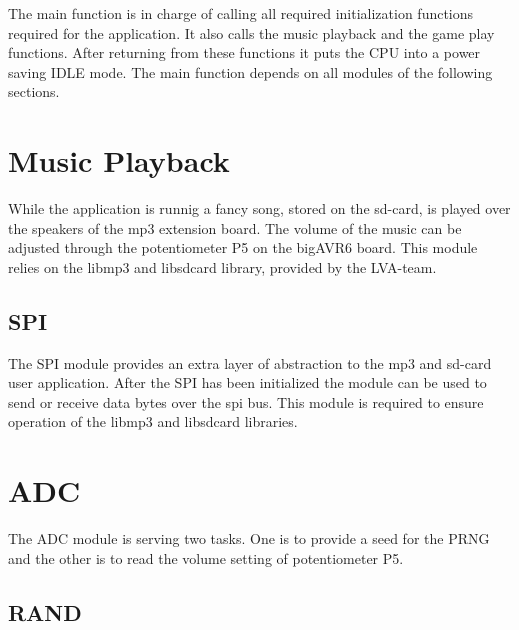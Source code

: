 \documentclass[12pt,a4paper,titlepage,oneside]{article}
\begin{document}
The main function is in charge of calling all required initialization functions
required for the application. It also calls the music playback and the game play
functions. After returning from these functions it puts the CPU into a power
saving IDLE mode.
\noindent
The main function depends on all modules of the following sections.

\section{Music Playback}

While the application is runnig a fancy song, stored on the sd-card, is played over 
the speakers of the mp3 extension board. The volume of the music can be adjusted 
through the potentiometer P5 on the bigAVR6 board.
\noindent
This module relies on the libmp3 and libsdcard library, provided by the LVA-team.

\subsection{SPI}

The SPI module provides an extra layer of abstraction to the mp3 and sd-card
user application. After the SPI has been initialized the module can be used
to send or receive data bytes over the spi bus. This module is required to 
ensure operation of the libmp3 and libsdcard libraries. 

\section{ADC}

The ADC module is serving two tasks. One is to provide a seed for the PRNG 
and the other is to read the volume setting of potentiometer P5.

\subsection{RAND}
\end{document}
